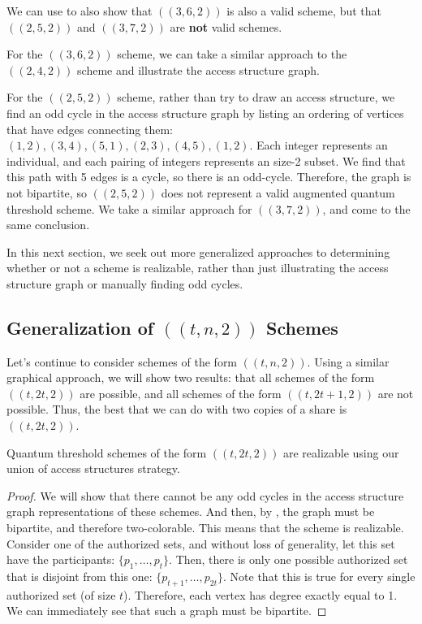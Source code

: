 We can use  to also show that $((3,6,2))$ is also a valid scheme, but that $((2,5,2))$ and $((3,7,2))$ are \textbf{not} valid schemes. 

For the $((3,6,2))$ scheme, we can take a similar approach to the $((2,4,2))$ scheme and illustrate the access structure graph.

For the $((2,5,2))$ scheme, rather than try to draw an access structure, we find an odd cycle in the access structure graph by listing an ordering of vertices that have edges connecting them: $(1,2), (3,4), (5,1), (2,3), (4,5), (1,2)$. Each integer represents an individual, and each pairing of integers represents an size-2 subset. We find that this path with 5 edges is a cycle, so there is an odd-cycle. Therefore, the graph is not bipartite, so $((2,5,2))$ does not represent a valid augmented quantum threshold scheme. We take a similar approach for $((3,7,2))$, and come to the same conclusion.

In this next section, we seek out more generalized approaches to determining whether or not a scheme is realizable, rather than just illustrating the access structure graph or manually finding odd cycles.

\subsection{Generalization of $((t,n,2))$ Schemes}

Let's continue to consider schemes of the form $((t,n,2))$. Using a similar graphical approach, we will show two results: that all schemes of the form $((t,2t,2))$ are possible, and all schemes of the form $((t, 2t+1, 2))$ are not possible. Thus, the best that we can do with two copies of a share is $((t,2t,2))$. 

\begin{theorem}
    \label{thm:t-2t-2}
    Quantum threshold schemes of the form $((t,2t,2))$ are realizable using our union of access structures strategy.
\end{theorem}

\begin{proof}
    We will show that there cannot be any odd cycles in the access structure graph representations of these schemes. And then, by , the graph must be bipartite, and therefore two-colorable. This means that the scheme is realizable. Consider one of the authorized sets, and without loss of generality, let this set have the participants: $\{p_1,\dots,p_t\}$. Then, there is only one possible authorized set that is disjoint from this one: $\{p_{t+1},\dots,p_{2t}\}$. Note that this is true for every single authorized set (of size $t$). Therefore, each vertex has degree exactly equal to 1. We can immediately see that such a graph must be bipartite.
\end{proof}

